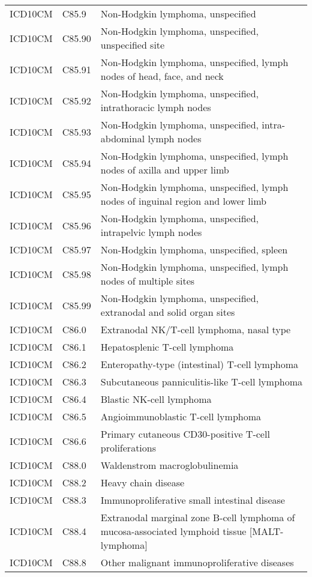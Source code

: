 \begin{longtable}{p{}p{}p{}}
  ICD10CM & C85.9 & Non-Hodgkin lymphoma, unspecified \\ 
  ICD10CM & C85.90 & Non-Hodgkin lymphoma, unspecified, unspecified site \\ 
  ICD10CM & C85.91 & Non-Hodgkin lymphoma, unspecified, lymph nodes of head, face, and neck \\ 
  ICD10CM & C85.92 & Non-Hodgkin lymphoma, unspecified, intrathoracic lymph nodes \\ 
  ICD10CM & C85.93 & Non-Hodgkin lymphoma, unspecified, intra-abdominal lymph nodes \\ 
  ICD10CM & C85.94 & Non-Hodgkin lymphoma, unspecified, lymph nodes of axilla and upper limb \\ 
  ICD10CM & C85.95 & Non-Hodgkin lymphoma, unspecified, lymph nodes of inguinal region and lower limb \\ 
  ICD10CM & C85.96 & Non-Hodgkin lymphoma, unspecified, intrapelvic lymph nodes \\ 
  ICD10CM & C85.97 & Non-Hodgkin lymphoma, unspecified, spleen \\ 
  ICD10CM & C85.98 & Non-Hodgkin lymphoma, unspecified, lymph nodes of multiple sites \\ 
  ICD10CM & C85.99 & Non-Hodgkin lymphoma, unspecified, extranodal and solid organ sites \\ 
  ICD10CM & C86.0 & Extranodal NK/T-cell lymphoma, nasal type \\ 
  ICD10CM & C86.1 & Hepatosplenic T-cell lymphoma \\ 
  ICD10CM & C86.2 & Enteropathy-type (intestinal) T-cell lymphoma \\ 
  ICD10CM & C86.3 & Subcutaneous panniculitis-like T-cell lymphoma \\ 
  ICD10CM & C86.4 & Blastic NK-cell lymphoma \\ 
  ICD10CM & C86.5 & Angioimmunoblastic T-cell lymphoma \\ 
  ICD10CM & C86.6 & Primary cutaneous CD30-positive T-cell proliferations \\ 
  ICD10CM & C88.0 & Waldenstrom macroglobulinemia \\ 
  ICD10CM & C88.2 & Heavy chain disease \\ 
  ICD10CM & C88.3 & Immunoproliferative small intestinal disease \\ 
  ICD10CM & C88.4 & Extranodal marginal zone B-cell lymphoma of mucosa-associated lymphoid tissue [MALT-lymphoma] \\ 
  ICD10CM & C88.8 & Other malignant immunoproliferative diseases \\ 

\end{longtable}

